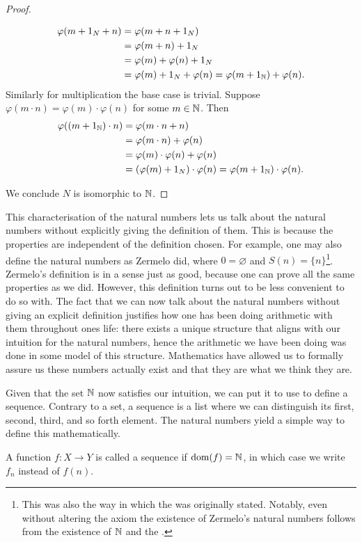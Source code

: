 \documentclass[../main.tex]{subfiles}
\begin{document}
\begin{proof}
\begin{description}
        \begin{align*}
            \varphi(m+1_N+n) & =\varphi(m+n+1_N) \\
            & =\varphi(m+n)+1_N \\
            & =\varphi(m)+\varphi(n)+1_N \\
            & =\varphi(m)+1_N+\varphi(n)=\varphi(m+1_{\mathbb{N}})+\varphi(n).
        \end{align*}
        Similarly for multiplication the base case is trivial. Suppose $\varphi(m\cdot n)=\varphi(m)\cdot\varphi(n)$ for some $m\in\mathbb{N}$. Then
        \begin{align*}
            \varphi((m+1_{\mathbb{N}})\cdot n) & =\varphi(m\cdot n+n) \\
            & =\varphi(m\cdot n)+\varphi(n) \\
            & =\varphi(m)\cdot\varphi(n)+\varphi(n) \\
            & =(\varphi(m)+1_N)\cdot\varphi(n)=\varphi(m+1_{\mathbb{N}})\cdot\varphi(n).
        \end{align*}
    \end{description}
    We conclude $N$ is isomorphic to $\mathbb{N}$.
\end{proof}
This characterisation of the natural numbers lets us talk about the natural numbers without explicitly giving the definition of them. This is because the properties are independent of the definition chosen. For example, one may also define the natural numbers as Zermelo did, where $0=\varnothing$ and $S(n)=\{n\}$\footnote{This was also the way in which the  was originally stated. Notably, even without altering the axiom the existence of Zermelo's natural numbers follows from the existence of $\mathbb{N}$ and the .}. Zermelo's definition is in a sense just as good, because one can prove all the same properties as we did. However, this definition turns out to be less convenient to do so with. The fact that we can now talk about the natural numbers without giving an explicit definition justifies how one has been doing arithmetic with them throughout ones life: there exists a unique structure that aligns with our intuition for the natural numbers, hence the arithmetic we have been doing was done in some model of this structure. Mathematics have allowed us to formally assure us these numbers actually exist and that they are what we think they are.

Given that the set $\mathbb{N}$ now satisfies our intuition, we can put it to use to define a sequence. Contrary to a set, a sequence is a list where we can distinguish its first, second, third, and so forth element. The natural numbers yield a simple way to define this mathematically.
\begin{definition}[Sequence]
    A function $f:X\to Y$ is called a sequence if $\operatorname{dom}(f)=\mathbb{N}$, in which case we write $f_n$ instead of $f(n)$.
\end{definition}
\end{document}
